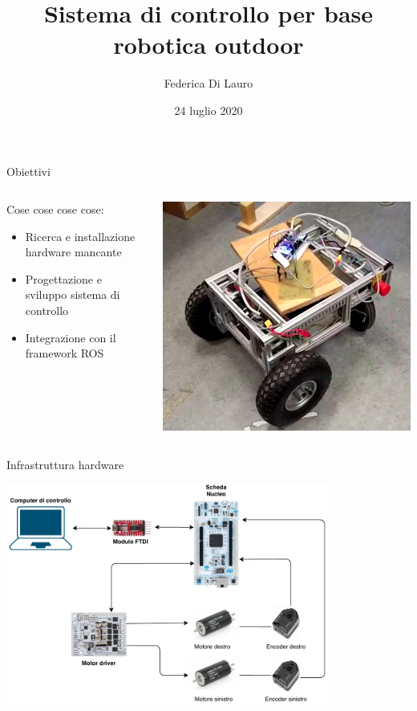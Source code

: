 \documentclass{beamer}
\author{Federica Di Lauro}
\title{Sistema di controllo per base robotica outdoor}
\date{24 luglio 2020}
\begin{document}
\titlepageframe %

\begin{tframe}{Obiettivi}

\begin{columns}
\begin{column}{0.45\textwidth}
Cose cose cose cose:
\begin{itemize}
    \item Ricerca e installazione hardware mancante
    \item Progettazione e sviluppo sistema di controllo
    \item Integrazione con il framework ROS
\end{itemize}

\end{column}

\begin{column}{0.45\textwidth}
\begin{center}
\includegraphics[width=0.9\columnwidth]{img/otto2.png}
\end{center}
\end{column}
\end{columns}
\end{tframe}

\begin{tframe}{Infrastruttura hardware}
\begin{center}
    \includegraphics[width=0.8\textwidth]{img/infrastruttura.pdf}
\end{center}
\end{tframe}
\end{document}
